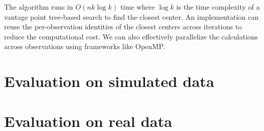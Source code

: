 \documentclass{article}
\begin{document}
The algorithm runs in $O(nk\log k)$ time where $\log k$ is the time complexity of a vantage point tree-based search \cite{yianilos1993data} to find the closest center.
An implementation can reuse the per-observation identities of the closest centers across iterations to reduce the computational cost.
We can also effectively parallelize the calculations across observations using frameworks like OpenMP.

\section{Evaluation on simulated data}

\section{Evaluation on real data}



\end{document}
